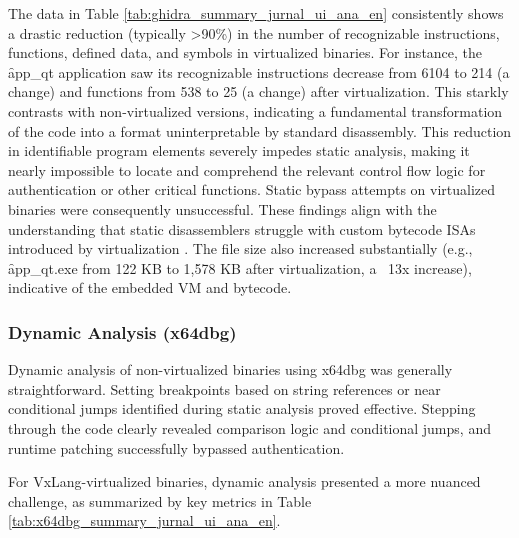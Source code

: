 The data in Table \ref{tab:ghidra_summary_jurnal_ui_ana_en} consistently shows a drastic reduction (typically >90\%) in the number of recognizable instructions, functions, defined data, and symbols in virtualized binaries. For instance, the \f{app\_qt} application saw its recognizable instructions decrease from 6104 to 214 (a  change) and functions from 538 to 25 (a  change) after virtualization. This starkly contrasts with non-virtualized versions, indicating a fundamental transformation of the code into a format uninterpretable by standard disassembly. This reduction in identifiable program elements severely impedes static analysis, making it nearly impossible to locate and comprehend the relevant control flow logic for authentication or other critical functions. Static bypass attempts on virtualized binaries were consequently unsuccessful. These findings align with the understanding that static disassemblers struggle with custom bytecode ISAs introduced by virtualization \cite{Sikorski2012, Eilam2011, Ko2007}. The file size also increased substantially (e.g., \f{app\_qt.exe} from 122 KB to 1,578 KB after virtualization, a ~13x increase), indicative of the embedded VM and bytecode.

\subsubsection{Dynamic Analysis (x64dbg)}
Dynamic analysis of non-virtualized binaries using x64dbg was generally straightforward. Setting breakpoints based on string references or near conditional jumps identified during static analysis proved effective. Stepping through the code clearly revealed comparison logic and conditional jumps, and runtime patching successfully bypassed authentication.

For VxLang-virtualized binaries, dynamic analysis presented a more nuanced challenge, as summarized by key metrics in Table \ref{tab:x64dbg_summary_jurnal_ui_ana_en}.

